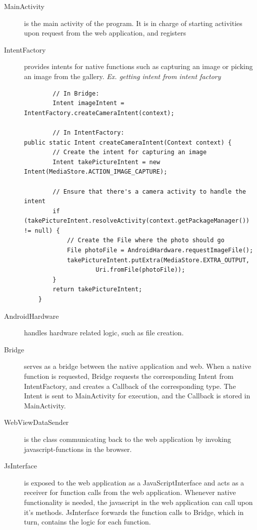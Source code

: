 \begin{description}
	\item[MainActivity] is the main activity of the program. It is in charge of starting activities upon request from the web application, and registers 
	
	
	\item[IntentFactory] provides intents for native functions such as capturing an image or picking an image from the gallery.
	\emph{Ex. getting intent from intent factory}\\
	
	\begin{lstlisting}
		// In Bridge:
		Intent imageIntent = IntentFactory.createCameraIntent(context);
		
		// In IntentFactory:
public static Intent createCameraIntent(Context context) {
        // Create the intent for capturing an image
        Intent takePictureIntent = new Intent(MediaStore.ACTION_IMAGE_CAPTURE);

        // Ensure that there's a camera activity to handle the intent
        if (takePictureIntent.resolveActivity(context.getPackageManager()) != null) {
            // Create the File where the photo should go
            File photoFile = AndroidHardware.requestImageFile();
            takePictureIntent.putExtra(MediaStore.EXTRA_OUTPUT,
                    Uri.fromFile(photoFile));
        }
        return takePictureIntent;
    }
	\end{lstlisting}
	
	\item[AndroidHardware] handles hardware related logic, such as file creation.
	
	\item[Bridge] serves as a bridge between the native application and web. When a native function is requested, Bridge requests the corresponding Intent from IntentFactory, and creates a Callback of the corresponding type. The Intent is sent to MainActivity for execution, and the Callback is stored in MainActivity.
	
	\item[WebViewDataSender] is the class communicating back to the web application by invoking javascript-functions in the browser.
	
	\item[JsInterface] is exposed to the web application as a JavaScriptInterface and acts as a receiver for function calls from the web application. Whenever native functionality is needed, the javascript in the web application can call upon it's methods. JsInterface forwards the function calls to Bridge, which in turn, contains the logic for each function.
	

\end{description}
